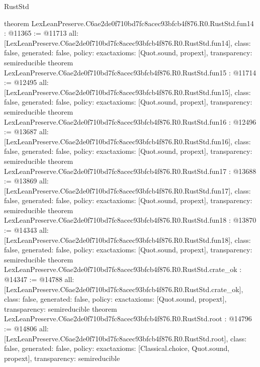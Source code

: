 \begin{lexlean}{RustStd}
\begin{coremodule}
{}
theorem LexLeanPreserve.C6ae2de0f710bd7fc8acec93bfcb4f876.R0.RustStd.fun14 : @11365 := @11713 {
  all: [LexLeanPreserve.C6ae2de0f710bd7fc8acec93bfcb4f876.R0.RustStd.fun14],
  class: false,
  generated: false,
  policy: exact{axioms: [Quot.sound, propext]},
  transparency: semireducible
}
theorem LexLeanPreserve.C6ae2de0f710bd7fc8acec93bfcb4f876.R0.RustStd.fun15 : @11714 := @12495 {
  all: [LexLeanPreserve.C6ae2de0f710bd7fc8acec93bfcb4f876.R0.RustStd.fun15],
  class: false,
  generated: false,
  policy: exact{axioms: [Quot.sound, propext]},
  transparency: semireducible
}
theorem LexLeanPreserve.C6ae2de0f710bd7fc8acec93bfcb4f876.R0.RustStd.fun16 : @12496 := @13687 {
  all: [LexLeanPreserve.C6ae2de0f710bd7fc8acec93bfcb4f876.R0.RustStd.fun16],
  class: false,
  generated: false,
  policy: exact{axioms: [Quot.sound, propext]},
  transparency: semireducible
}
theorem LexLeanPreserve.C6ae2de0f710bd7fc8acec93bfcb4f876.R0.RustStd.fun17 : @13688 := @13869 {
  all: [LexLeanPreserve.C6ae2de0f710bd7fc8acec93bfcb4f876.R0.RustStd.fun17],
  class: false,
  generated: false,
  policy: exact{axioms: [Quot.sound, propext]},
  transparency: semireducible
}
theorem LexLeanPreserve.C6ae2de0f710bd7fc8acec93bfcb4f876.R0.RustStd.fun18 : @13870 := @14343 {
  all: [LexLeanPreserve.C6ae2de0f710bd7fc8acec93bfcb4f876.R0.RustStd.fun18],
  class: false,
  generated: false,
  policy: exact{axioms: [Quot.sound, propext]},
  transparency: semireducible
}
theorem LexLeanPreserve.C6ae2de0f710bd7fc8acec93bfcb4f876.R0.RustStd.crate_ok : @14347 := @14788 {
  all: [LexLeanPreserve.C6ae2de0f710bd7fc8acec93bfcb4f876.R0.RustStd.crate_ok],
  class: false,
  generated: false,
  policy: exact{axioms: [Quot.sound, propext]},
  transparency: semireducible
}
theorem LexLeanPreserve.C6ae2de0f710bd7fc8acec93bfcb4f876.R0.RustStd.root : @14796 := @14806 {
  all: [LexLeanPreserve.C6ae2de0f710bd7fc8acec93bfcb4f876.R0.RustStd.root],
  class: false,
  generated: false,
  policy: exact{axioms: [Classical.choice, Quot.sound, propext]},
  transparency: semireducible
}


\end{coremodule}
\end{lexlean}
